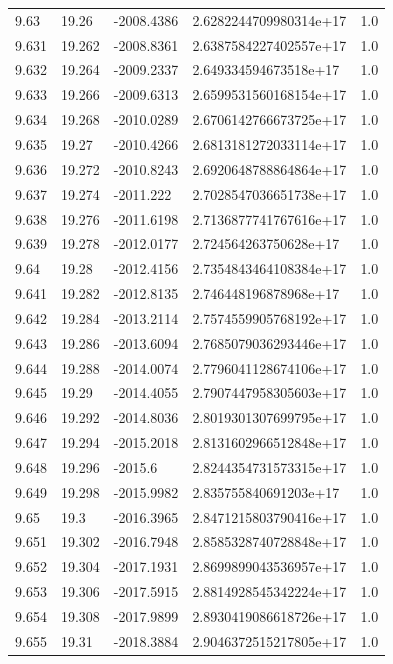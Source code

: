 \begin{tabular}{lllll}
9.63 & 19.26 & -2008.4386 & 2.6282244709980314e+17 & 1.0 \\
9.631 & 19.262 & -2008.8361 & 2.6387584227402557e+17 & 1.0 \\
9.632 & 19.264 & -2009.2337 & 2.649334594673518e+17 & 1.0 \\
9.633 & 19.266 & -2009.6313 & 2.6599531560168154e+17 & 1.0 \\
9.634 & 19.268 & -2010.0289 & 2.6706142766673725e+17 & 1.0 \\
9.635 & 19.27 & -2010.4266 & 2.6813181272033114e+17 & 1.0 \\
9.636 & 19.272 & -2010.8243 & 2.6920648788864864e+17 & 1.0 \\
9.637 & 19.274 & -2011.222 & 2.7028547036651738e+17 & 1.0 \\
9.638 & 19.276 & -2011.6198 & 2.7136877741767616e+17 & 1.0 \\
9.639 & 19.278 & -2012.0177 & 2.724564263750628e+17 & 1.0 \\
9.64 & 19.28 & -2012.4156 & 2.7354843464108384e+17 & 1.0 \\
9.641 & 19.282 & -2012.8135 & 2.746448196878968e+17 & 1.0 \\
9.642 & 19.284 & -2013.2114 & 2.7574559905768192e+17 & 1.0 \\
9.643 & 19.286 & -2013.6094 & 2.7685079036293446e+17 & 1.0 \\
9.644 & 19.288 & -2014.0074 & 2.7796041128674106e+17 & 1.0 \\
9.645 & 19.29 & -2014.4055 & 2.7907447958305603e+17 & 1.0 \\
9.646 & 19.292 & -2014.8036 & 2.8019301307699795e+17 & 1.0 \\
9.647 & 19.294 & -2015.2018 & 2.8131602966512848e+17 & 1.0 \\
9.648 & 19.296 & -2015.6 & 2.8244354731573315e+17 & 1.0 \\
9.649 & 19.298 & -2015.9982 & 2.835755840691203e+17 & 1.0 \\
9.65 & 19.3 & -2016.3965 & 2.8471215803790416e+17 & 1.0 \\
9.651 & 19.302 & -2016.7948 & 2.8585328740728848e+17 & 1.0 \\
9.652 & 19.304 & -2017.1931 & 2.8699899043536957e+17 & 1.0 \\
9.653 & 19.306 & -2017.5915 & 2.8814928545342224e+17 & 1.0 \\
9.654 & 19.308 & -2017.9899 & 2.8930419086618726e+17 & 1.0 \\
9.655 & 19.31 & -2018.3884 & 2.9046372515217805e+17 & 1.0 \\

\end{tabular}
